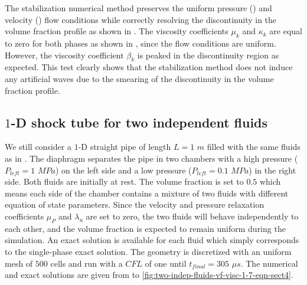 %
The stabilization numerical method preserves the uniform pressure () and velocity () flow conditions while correctly resolving the discontinuity in the volume fraction profile as shown in . The viscosity coefficients $\mu_k$ and $\kappa_k$ are equal to zero for both phases as shown in , since the flow conditions are uniform. However, the viscosity coefficient $\beta_k$ is peaked in the discontinuity region as expected. This test clearly shows that the stabilization method does not induce any artificial waves due to the smearing of the discontinuity in the volume fraction profile.
\subsection{$1$-D shock tube for two independent fluids}\label{sec:1d-2-ind-phases-7-eq-sct4}
We still consider a $1$-D straight pipe of length $L=1$ $m$ filled with the same fluids as in . The diaphragm separates the pipe in two chambers with a high pressure ($P_{left} = 1$ $MPa$) on the left side and a low pressure ($P_{left} = 0.1$ $MPa$) in the right side. Both fluids are initially at rest. The volume fraction is set to $0.5$ which means each side of the chamber contains a mixture of two fluids with different equation of state parameters. Since the velocity and pressure relaxation coefficients $\mu_P$ and $\lambda_u$ are set to zero, the two fluids will behave independently to each other, and the volume fraction is expected to remain uniform during the simulation. An exact solution is available for each fluid which simply corresponds to the single-phase exact solution. The geometry is discretized with an uniform mesh of $500$ cells and run with a $CFL$ of one until $t_{final} = 305$ $\mu s$. The numerical and exact solutions are given from  to \ref{fig:two-indep-fluids-vf-visc-1-7-eqn-sect4}.
%
